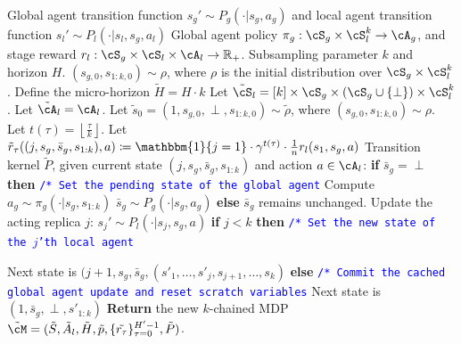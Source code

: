 \documentclass{article}
\theoremstyle{plain}
\theoremstyle{definition}
\begin{document}
\begin{algorithm}
    \begin{algorithmic}
        \caption{$k$-chained MDP for the local agent's best-response to policy $\pi_g:\cS_g\times\cS_l^k\to\cA_g$}
        \REQUIRE Global agent transition function $s_g' \sim P_g(\cdot|s_g, a_g)$ and local agent transition function $s_l' \sim P_l(\cdot|s_l, s_g, a_l)$
        \REQUIRE Global agent policy $\pi_g:\cS_g\times\cS_l^k \to \cA_g$, and stage reward $r_l:\cS_g\times\cS_l\times\cA_l\to \mathbb{R}_+$.
        \REQUIRE Subsampling parameter $k$ and horizon $H$.
        \REQUIRE $(s_{g,0}, s_{1:k,0})\sim \rho$, where $\rho$ is the initial distribution over $\cS_g\times\cS_l^k$.
        \medskip
        \STATE Define the micro-horizon $\widetilde{H} = H\cdot k$
        \STATE Let $\tilde{\cS}_l = [k] \times \cS_g\times (\cS_g\cup\{\perp\}) \times \cS_l^k$.
        \STATE Let $\tilde{\cA}_l = \cA_l$.
        \STATE Let $\tilde{s}_0 = (1, s_{g,0}, \perp, s_{1:k,0}) \sim \tilde{\rho}$, where $(s_{g,0}, s_{1:k,0})\sim \rho$.
        \STATE Let $t(\tau) = \left\lfloor\frac{\tau}{k}\right\rfloor$.
        \STATE Let $\tilde{r}_\tau((j, s_g, \bar{s}_g, s_{1:k}), a) \coloneqq \mathbbm{1}\{j=1\}\cdot \gamma^{t(\tau)}\cdot \frac{1}{n}r_l(s_1, s_g, a)$
        \medskip
        \STATE Transition kernel $\tilde{P}$, given current state $(j, s_g, \bar{s}_g, s_{1:k})$ and action $a\in \cA_l$:
        \STATE \quad\textbf{if} {$\bar{s}_g=\perp$} \textbf{then}
        \STATE \quad\quad \textcolor{blue}{\texttt{/* Set the pending state of the global agent}}
        \STATE \quad\quad Compute $a_g\sim \pi_g(\cdot|s_g, s_{1:k})$
        \STATE \quad\quad $\bar{s}_g\sim P_g(\cdot|s_g, a_g)$
        \STATE \quad\textbf{else}
        \STATE \quad\quad $\bar{s}_g$ remains unchanged.
        \STATE \quad Update the acting replica $j$: $s_j'\sim P_l(\cdot|s_j, s_g, a)$
        \STATE \quad\textbf{if} {$j<k$} \textbf{then}
        \STATE \quad\quad \textcolor{blue}{\texttt{/* Set the new state of the $j$'th local agent}}

        \STATE \quad\quad Next state is $(j+1, s_g, \bar{s}_g, (s'_1, \dots, s'_j, s_{j+1},\dots, s_k)$
        \STATE \quad\textbf{else}
        \STATE \quad\quad \textcolor{blue}{\texttt{/* Commit the cached global agent update and reset scratch variables}}
        \STATE \quad\quad Next state is $(1, \bar{s}_g, \perp, s'_{1:k})$
        \medskip
        \STATE \textbf{Return} the new $k$-chained MDP $\tilde{\cM} = (\tilde{S}, \tilde{A}_l, \tilde{H}, \tilde{p}, \{\tilde{r_\tau}\}_{\tau=0}^{H'-1}, \tilde{P})$. 

        
    \label{algorithm: k chained induced MDP}
    \end{algorithmic}
\end{algorithm}
\end{document}
